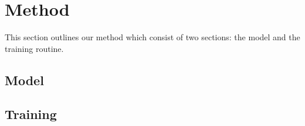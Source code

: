 \section{Method}

This section outlines our method which consist of two sections: the model and the training routine.

\subsection{Model}

\subsection{Training}
